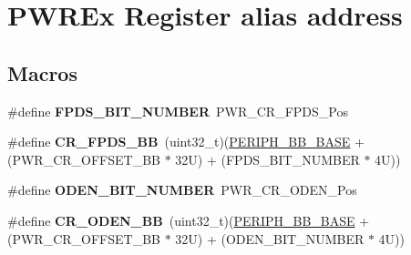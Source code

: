 \hypertarget{group___p_w_r_ex__register__alias__address}{}\section{P\+W\+R\+Ex Register alias address}
\label{group___p_w_r_ex__register__alias__address}
\subsection*{Macros}
\begin{DoxyCompactItemize}
\item 
\mbox{\label{group___p_w_r_ex__register__alias__address_gab04d9f278c4124285a9591c4f7098019}} 
\#define {\bfseries F\+P\+D\+S\+\_\+\+B\+I\+T\+\_\+\+N\+U\+M\+B\+ER}~P\+W\+R\+\_\+\+C\+R\+\_\+\+F\+P\+D\+S\+\_\+\+Pos
\item 
\mbox{\label{group___p_w_r_ex__register__alias__address_ga57d7041b5d1bf0ec94fa18152a7fa208}} 
\#define {\bfseries C\+R\+\_\+\+F\+P\+D\+S\+\_\+\+BB}~(uint32\+\_\+t)(\hyperlink{group___peripheral__memory__map_gaed7efc100877000845c236ccdc9e144a}{P\+E\+R\+I\+P\+H\+\_\+\+B\+B\+\_\+\+B\+A\+SE} + (P\+W\+R\+\_\+\+C\+R\+\_\+\+O\+F\+F\+S\+E\+T\+\_\+\+BB $\ast$ 32\+U) + (\+F\+P\+D\+S\+\_\+\+B\+I\+T\+\_\+\+N\+U\+M\+B\+E\+R $\ast$ 4\+U))
\item 
\mbox{\label{group___p_w_r_ex__register__alias__address_gace51402e8067c2b478e3bcbc6efe0b70}} 
\#define {\bfseries O\+D\+E\+N\+\_\+\+B\+I\+T\+\_\+\+N\+U\+M\+B\+ER}~P\+W\+R\+\_\+\+C\+R\+\_\+\+O\+D\+E\+N\+\_\+\+Pos
\item 
\mbox{\label{group___p_w_r_ex__register__alias__address_ga1ce2817ed3cc064b3577f90cbb23be35}} 
\#define {\bfseries C\+R\+\_\+\+O\+D\+E\+N\+\_\+\+BB}~(uint32\+\_\+t)(\hyperlink{group___peripheral__memory__map_gaed7efc100877000845c236ccdc9e144a}{P\+E\+R\+I\+P\+H\+\_\+\+B\+B\+\_\+\+B\+A\+SE} + (P\+W\+R\+\_\+\+C\+R\+\_\+\+O\+F\+F\+S\+E\+T\+\_\+\+BB $\ast$ 32\+U) + (\+O\+D\+E\+N\+\_\+\+B\+I\+T\+\_\+\+N\+U\+M\+B\+E\+R $\ast$ 4\+U))
\item 
\mbox{\label{group___p_w_r_ex__register__alias__address_gaedd8b85a6ee45b4816a46e7295525d50}} 

\end{DoxyCompactItemize}
